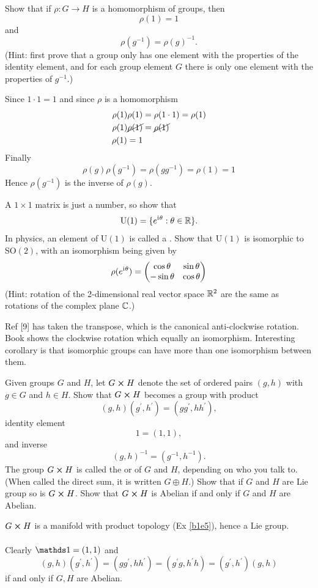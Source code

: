 \documentclass[10pt]{article}
\begin{document}
\begin{example}
	Show that if $\rho:G\to H$ is a homomorphism of groups, then
	$$
	\rho(1) = 1
	$$
	and
	$$
	\rho(g^{-1}) = \rho(g)^{-1}.
	$$
	(Hint: first prove that a group only has one element with the properties of the identity element, and for each group element $G$ there is only one element with the properties of $g^{-1}$.)
\end{example}
\sol Since $1\cdot 1 = 1$ and since $\rho$ is a homomorphism
$$\begin{aligned}
	\rho(1)\rho(1) &= \rho(1 \cdot 1) = \rho(1)\\
	\rho(1)\cancel{\rho(1)} &= \cancel{\rho(1)}\\
	\rho(1) = 1
\end{aligned}
$$
Finally
$$
\rho(g)\rho(g^{-1}) = \rho(gg^{-1}) = \rho(1) = 1
$$
Hence $\rho(g^{-1})$ is the inverse of $\rho(g)$.


\begin{example}
	A $1 \times 1$ matrix is just a number, so show that
	$$
	\text{U}(1)=\lbrace e^{\mathrm{i}\mkern1mu \theta}:\theta \in \mathbb{R}\rbrace.
	$$
	In physics, an element of U$(1)$ is called a . Show that U$(1)$ is isomorphic to SO$(2)$, with an isomorphism being given by
	$$
	\rho(e^{\mathrm{i}\mkern1mu \theta}) = \begin{pmatrix}
		\cos\theta&\sin\theta\\
		-\sin\theta&\cos\theta
	\end{pmatrix}
	$$
	(Hint: rotation of the 2-dimensional real vector space $\mathbb{R}^2$ are the same as rotations of the complex plane $\mathbb{C}$.)
\end{example}
\sol Ref [9] has taken the transpose, which is the canonical anti-clockwise rotation. Book shows the clockwise rotation which equally an isomorphism. Interesting corollary is that isomorphic groups can have more than one isomorphism between them.


\begin{example}
	Given groups $G$ and $H$, let $G \cross H$ denote the set of ordered pairs $(g, h)$ with $g \in G$ and $h \in H$. Show that $G \cross H$ becomes a group with product
	$$
	(g,h)(g^\prime, h^\prime) = (gg^\prime,hh^\prime),
	$$
	identity element
	$$
	1=(1,1),
	$$
	and inverse
	$$
	(g,h)^{-1}=(g^{-1},h^{-1}).
	$$
	The group $G \cross H$ is called the  or  of $G$ and $H$, depending on who you talk to. (When called the direct sum, it is written $G \oplus H$.) Show that if $G$ and $H$ are Lie group so is $G \cross H$. Show that $G \cross H$ is Abelian if and only if $G$ and $H$ are Abelian.
\end{example}
\sol $G \cross H$ is a manifold with product topology (Ex \ref{b1e5}), hence a Lie group.\\\\
Clearly $\id = (1,1)$ and
$$
(g,h)(g^\prime, h^\prime) = (gg^\prime,hh^\prime) = (g^\prime g, h^\prime h) = (g^\prime, h^\prime) (g,h)
$$
if and only if $G, H$ are Abelian.
\end{document}

